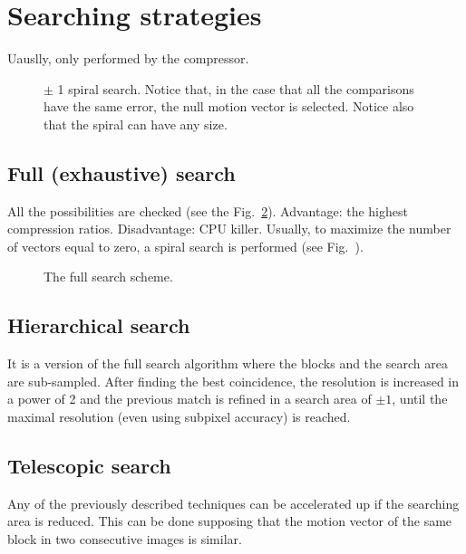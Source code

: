 \section{Searching strategies}

Uauslly, only performed by the compressor.

\begin{figure}
  \caption{$\pm$ 1 spiral search. Notice that, in the case that all the
    comparisons have the same error, the null motion vector is
    selected. Notice also that the spiral can have any size.}
  \label{fig:spiral_search}
\end{figure}

\subsection{Full (exhaustive) search}

All the possibilities are checked (see the
Fig.~\ref{fig:full_search}). Advantage: the highest compression
ratios. Disadvantage: CPU killer. Usually, to maximize the number of
vectors equal to zero, a spiral search is performed (see
Fig.~\cite{fig:spiral_search}).
  
\begin{figure}
  \caption{The full search scheme.}
  \label{fig:full_search}
\end{figure}


\subsection{Hierarchical search}

It is a version of the full search algorithm where the blocks
and the search area are sub-sampled. After finding the best
coincidence, the resolution is increased in a power of 2 and the
previous match is refined in a search area of $\pm 1$, until the
maximal resolution (even using subpixel accuracy) is reached.


\subsection{{Telescopic search}}

Any of the previously described techniques can be accelerated up if
the searching area is reduced. This can be done supposing that the
motion vector of the same block in two consecutive images is similar.

